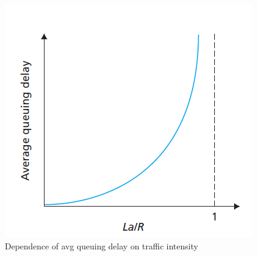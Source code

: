 \documentclass{article}
\theoremstyle{plain}
\theoremstyle{definition}
\begin{document}
\begin{figure}[h]
    \centering
    \includegraphics{cn10.png}
    \caption{Dependence of avg queuing delay on traffic intensity}
    \label{fig:my_label_10}
\end{figure}
\end{document}
